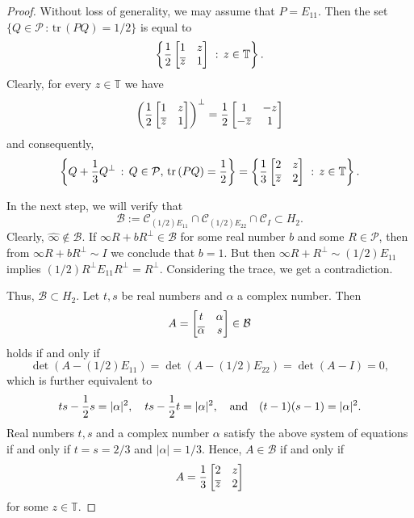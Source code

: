 \documentclass[10pt]{amsart}
\theoremstyle{definition}
\theoremstyle{remark}
\numberwithin{subsection}{section}
\numberwithin{equation}{section}
\newcommand\oi{{\widehat{\infty}}}
\begin{document}
\begin{proof}
Without loss of generality, we may assume that $P= E_{11}$. Then the set $\{ Q\in \mathcal{P} \, : \, \mathrm{tr}\, (PQ) = 1/2 \}$ is equal to
\[
\left\{ {1\over 2}\left[ \begin{matrix} {1} &  z \cr   \overline{z} &  {1}  \cr\end{matrix} \right] \ : \, z \in {\mathbb{T}} \right\}.
\]
Clearly, for every $z \in \mathbb{T}$ we have
\[
\left({1\over 2} \left[ \begin{matrix} {1} &  z \cr   \overline{z} &  {1}  \cr\end{matrix} \right] \right)^\perp =  {1\over 2} \left[ \begin{matrix} {1} &  - z \cr   -\overline{z} &  {1}  \cr\end{matrix} \right]
\]
and consequently, 
\[
 \left\{ Q + {1\over 3}Q^\perp \, : \, Q\in \mathcal{P}, \, \mathrm{tr}\, (PQ) = {1 \over 2} \right\} = 
\left\{ {1\over 3}\left[ \begin{matrix} {2} &   z \cr   \overline{z} &  {2}  \cr\end{matrix} \right] \ : \, z \in \mathbb{T} \right\} .
\]

In the next step, we will verify that 
\[
\mathcal{B} := \mathcal{C}_{(1/2)E_{11}} \cap \mathcal{C}_{{(1/2)}E_{22}} \cap \mathcal{C}_I\subset H_2.
\] Clearly, ${\oi}\not\in \mathcal{B}$. If $\infty R + bR^\perp \in \mathcal{B}$ for some real number $b$ and some $R \in \mathcal{P}$, then from 
$\infty R + bR^\perp  \sim I$ we conclude that $b=1$. But then  $\infty R + R^\perp  \sim (1/2)E_{11}$ implies $(1/2)R^\perp E_{11} R^\perp = R^\perp$. Considering the trace, we get 
a contradiction.

Thus, $\mathcal{B} \subset H_2$. 
Let $t,s$ be real numbers and $\alpha$ a complex number. 
Then 
\[
A =  
\left[ \begin{matrix}t &  \alpha \cr   \overline{\alpha} &  s  \cr\end{matrix} \right] \in \mathcal{B}
\]
holds if and only if 
\[
\det (A - (1/2)E_{11}) = \det (A - (1/2)E_{22}) = \det (A - I) = 0,
\]
which is further equivalent to
\[
ts - {1 \over 2}s = |\alpha|^2, \ \ \ ts - {1 \over 2}t = |\alpha|^2, \ \ \ \text{and} \ \ \ (t-1)(s-1)  = |\alpha|^2 .
\]
Real numbers $t,s$ and a complex number $\alpha$ satisfy the above system of equations if and only if $t=s= 2/3$ and $| \alpha | = 1/3$. Hence, $A \in \mathcal{B}$ if and only if
\[
A = {1\over 3}\left[ \begin{matrix} {2} &  z \cr   \overline{z} &  {2}  \cr\end{matrix} \right]
\] 
for some $z \in \mathbb{T}$.  
\end{proof}
\end{document}
